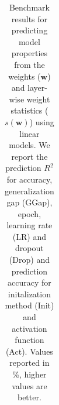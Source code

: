 \begin{table}[]
{
\scriptsize
\caption{Benchmark results for predicting model properties from the weights 
($\mathbf{w}$) and layer-wise weight statistics ($s(\mathbf{w})$) using linear models. 
We report the prediction $R^2$ for accuracy, generalization gap (GGap), epoch, learning rate (LR) and dropout (Drop) and prediction accuracy for initalization method (Init) and activation function (Act). 
Values reported in \%, higher values are better.
}
\label{tab:benchmark_prediction}
}
\begin{minipage}{\linewidth}
{
\scriptsize

\begin{tabular}{
    p{}
    p{}
    p{}
    >{\centering}p{}
    >{\centering}p{}
    >{\centering}p{}
    >{\centering}p{}
    >{\centering}p{}
    >{\centering}p{}
    >{\centering}p{}
    >{\centering}p{}
    >{\centering}p{}
    >{\centering\arraybackslash}p{}
    }


\end{tabular}}
\end{minipage}
\end{table}
